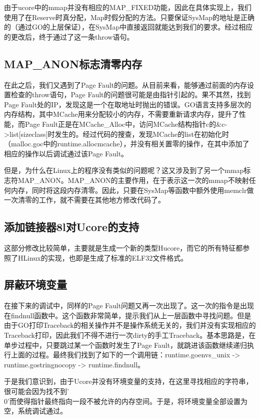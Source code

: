 \documentclass{article}
\begin{document}
由于ucore中的mmap并没有相应的MAP\_FIXED功能，因此在具体实现上，我们使用了在Reserve时真分配，Map时假分配的方法。只要保证SysMap的地址是正确的（通过GO的上层保证），在SysMap中直接返回就能达到我们的要求。经过相应的更改后，终于通过了这一条throw语句。

\subsection{MAP\_ANON标志清零内存}
在此之后，我们又遇到了Page Fault的问题。从目前来看，能够通过前面的内存设置检查的throw语句，Page Fault的问题很可能是由指针引起的。果不其然，找到Page Fault处的IP，发现这是一个在取地址时抛出的错误。GO语言支持多层次的内存结构，其中MCache用来分配较小的内存，不需要重新请求内存，提升了性能，而Page Fault正是在MCache\_Alloc中，访问MCache结构指针c的\&c->list[sizeclass]时发生的。经过代码的搜查，发现MCache的list在初始化时（malloc.goc中的runtime.allocmcache），并没有相关置零的操作，在其中添加了相应的操作以后调试通过该Page Fault。

但是，为什么在Linux上的程序没有类似的问题呢？这又涉及到了另一个mmap标志符MAP\_ANON。MAP\_ANON的主要作用，在于表示这一次的mmap不映射任何内存，同时将这段内存清零。因此，只要在SysMap等函数中额外使用memclr做一次清零的工作，就不需要在其他地方修改代码了。

\subsection{添加链接器8l对Ucore的支持}
这部分修改比较简单，主要就是生成一个新的类型Hucore，而它的所有特征都参照了HLinux的实现，也即是生成了标准的ELF32文件格式。

\subsection{屏蔽环境变量}
在接下来的调试中，同样的Page Fault问题又再一次出现了。这一次的指令是出现在findnull函数中。这个函数非常简单，提示我们从上一层函数中寻找问题。但是由于GO打印Traceback的相关操作并不是操作系统无关的，我们并没有实现相应的Traceback打印，因此我们不得不进行一次dirty的手工Traceback。基本思路是，在单步过程中，只要跳过某一个函数时发生了Page Fault，就跳进该函数继续递归执行上面的过程。最终我们找到了如下的一个调用链：runtime.goenvs\_unix -> runtime.gostringnocopy -> runtime.findnull。

于是我们意识到，由于Ucore并没有环境变量的支持，在这里寻找相应的字符串，很可能会因为找不到'\\0'而使得指针最终指向一段不被允许的内存空间。于是，将环境变量全部设置为空，系统调试通过。
\end{document}
